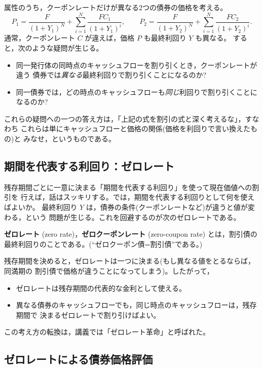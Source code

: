 属性のうち，クーポンレートだけが異なる2つの債券の価格を考える。
\[
P_1 = \frac{F}{(1+Y_1)^N} + \sum_{i=1}^{N}\frac{FC_1}{(1+Y_1)^i},
\qquad
P_2 = \frac{F}{(1+Y_2)^N} + \sum_{i=1}^{N}\frac{FC_2}{(1+Y_2)^i}.
\]
通常，クーポンレート $C$ が違えば，価格 $P$ も最終利回り $Y$ も異なる。
すると，次のような疑問が生じる。

\begin{itemize}
\item 同一発行体の同時点のキャッシュフローを割り引くとき，クーポンレートが違う
債券では\emph{異なる}最終利回りで割り引くことになるのか?
\item 同一債券では，どの時点のキャッシュフローも\emph{同じ}利回りで割り引くことに
なるのか?
\end{itemize}

これらの疑問への一つの答え方は，「上記の式を割引の式と深く考えるな」，すなわち
これらは単にキャッシュフローと価格の関係(価格を利回りで言い換えたもの)と
みなせ，というものである。

\subsection{期間を代表する利回り：ゼロレート}

残存期間ごとに一意に決まる「期間を代表する利回り」を使って現在価値への割引を
行えば，話はスッキリする。では，期間を代表する利回りとして何を使えばよいか。
最終利回り $Y$ は，債券の条件(クーポンレートなど)が違うと値が変わる，という
問題が生じる。これを回避するのが次のゼロレートである。

\begin{definition}[ゼロレート]
\textbf{ゼロレート} (zero rate)，\textbf{ゼロクーポンレート} (zero-coupon rate)
とは，割引債の最終利回りのことである。(“ゼロクーポン債=割引債”である。)
\end{definition}

残存期間を決めると，ゼロレートは一つに決まる(もし異なる値をとるならば，同満期の
割引債で価格が違うことになってしまう)。したがって，
\begin{itemize}
\item ゼロレートは残存期間の代表的な金利として使える。
\item 異なる債券のキャッシュフローでも，同じ時点のキャッシュフローは，残存期間で
決まるゼロレートで割り引けばよい。
\end{itemize}
この考え方の転換は，講義では「ゼロレート革命」と呼ばれた。

\subsection{ゼロレートによる債券価格評価}

